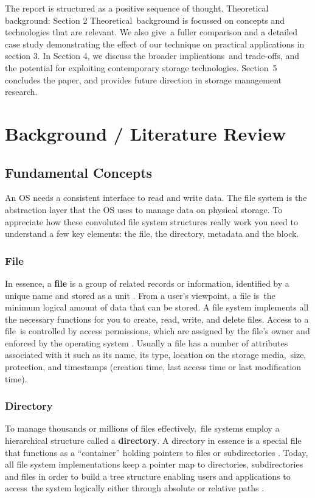 \documentclass[12pt]{article}
\begin{document}
The report is structured as a positive sequence of thought. Theoretical background: Section 2 Theoretical background is focussed on concepts and technologies that are relevant. We also give a fuller comparison and a detailed case study demonstrating the effect of our technique on practical applications in section 3. In Section 4, we discuss the broader implications and trade-offs, and the potential for exploiting contemporary storage technologies. Section 5 concludes the paper, and provides future direction in storage management research.

\section{Background / Literature Review}

\subsection{Fundamental Concepts}

An OS needs a consistent interface to read and write data. The file system is the abstraction layer that the OS uses to manage data on physical storage. To appreciate how these convoluted file system structures really work you need to understand a few key elements: the file, the directory, metadata and the block.

\subsubsection{File}
In essence, a \textbf{file} is a group of related records or information, identified by a unique name and stored as a unit \parencite{EMC2012InformationStorage}. From a user's viewpoint, a file is the minimum logical amount of data that can be stored. A file system implements all the necessary functions for you to create, read, write, and delete files. Access to a file is controlled by access permissions, which are assigned by the file's owner and enforced by the operating system \parencite{Silberschatz2018}. Usually a file has a number of attributes associated with it such as its name, its type, location on the storage media, size, protection, and timestamps (creation time, last access time or last modification time).


\subsubsection{Directory}
To manage thousands or millions of files effectively, file systems employ a hierarchical structure called a \textbf{directory}. A directory in essence is a special file that functions as a “container” holding pointers to files or subdirectories \parencite{EMC2012InformationStorage}. Today, all file system implementations keep a pointer map to directories, subdirectories and files in order to build a tree structure enabling users and applications to access the system logically either through absolute or relative paths \parencite{Tanenbaum2014}. 
\end{document}
